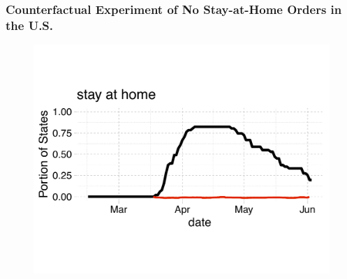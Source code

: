 \documentclass{beamer}
\begin{document}

\begin{frame}
  \frametitle{Counterfactual Experiment of No Stay-at-Home Orders in the U.S.}

\vspace{-0.5cm}
\begin{figure}[ht]%
  \begin{minipage}{\linewidth} 
      \includegraphics[width=\textwidth]{pshelter_p_experiment} 
  \end{minipage}
\end{figure}


\end{frame}



\end{document}
